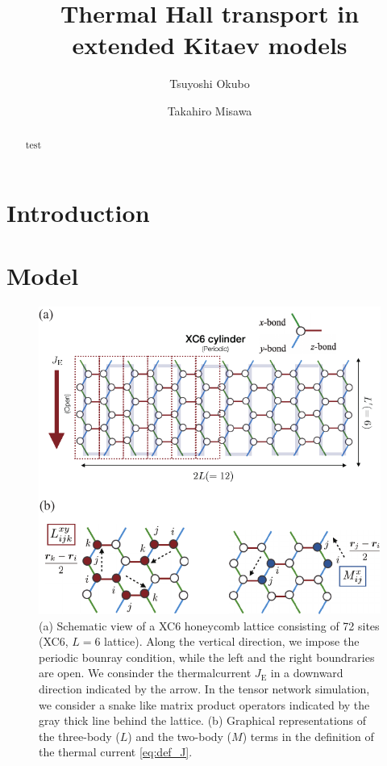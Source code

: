\documentclass[reprint,amsmath,amssymb,aps,prx]{revtex4-2}
\begin{document}
\title{Thermal Hall transport in extended Kitaev models}
\author{Tsuyoshi Okubo}
\author{Takahiro Misawa}


\begin{abstract}
test
\end{abstract}

\maketitle
\section{Introduction}


\section{Model}
\begin{figure}
  \begin{center}
    \includegraphics[width=\linewidth]{lattice.pdf}
  \end{center}
  \caption{(a) Schematic view of a XC6 honeycomb lattice consisting of 72 sites (XC6, $L=6$ lattice). Along the vertical direction, we impose the periodic bounray condition, while the left and the right boundraries are open. We consinder the thermalcurrent $J_{\mathrm{E}}$ in a downward direction indicated by the arrow. In the tensor network simulation, we consider a snake like matrix product operators indicated by the gray thick line behind the lattice. (b) Graphical representations of the three-body ($L$) and the two-body ($M$) terms in the definition of the thermal current \eqref{eq:def_J}.}
  \label{fig:lattice}
\end{figure}
\end{document}
